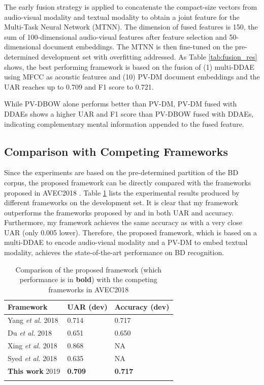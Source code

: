 The early fusion strategy is applied to concatenate the compact-size vectors from audio-visual modality and textual modality to obtain a joint feature for the Multi-Task Neural Network (MTNN). The dimension of fused features is 150, the sum of 100-dimensional audio-visual features after feature selection and 50-dimensional document embeddings. The MTNN is then fine-tuned on the pre-determined development set with overfitting addressed. As Table \ref{tab:fusion_res} shows, the best performing framework is based on the fusion of (1) multi-DDAE using MFCC as acoustic features and (10) PV-DM document embeddings and the UAR reaches up to 0.709 and F1 score to 0.721. 

While PV-DBOW alone performs better than PV-DM, PV-DM fused with DDAEs shows a higher UAR and F1 score than PV-DBOW fused with DDAEs, indicating complementary mental information appended to the fused feature.



\subsection{Comparison with Competing Frameworks}

Since the experiments are based on the pre-determined partition of the BD corpus, the proposed framework can be directly compared with the frameworks proposed in AVEC2018 \cite{ringeval2018}. Table \ref{tab:avec2018_compare} lists the experimental results produced by different frameworks on the development set. It is clear that my framework outperforms the frameworks proposed by \cite{du2018} and \cite{syed2018} in both UAR and accuracy. Furthermore, my framework achieves the same accuracy as \cite{yang2018} with a very close UAR (only 0.005 lower). Therefore, the proposed framework, which is based on a multi-DDAE to encode audio-visual modality and a PV-DM to embed textual modality, achieves the state-of-the-art performance on BD recognition.

\begin{table}[h]
    \small
    \centering
    \caption{Comparison of the proposed framework (which performance is in \textbf{bold}) with the competing frameworks in AVEC2018}
    \begin{tabular}{l|l|l}
    \Xhline{2\arrayrulewidth}
        Framework & UAR (dev) & Accuracy (dev) \\
        \hline
        Yang \textit{et al.} 2018 & 0.714 & 0.717 \\
        \hline
        Du \textit{et al.} 2018 & 0.651 & 0.650 \\
        \hline
        Xing \textit{et al.} 2018 & 0.868 & NA \\
        \hline
        Syed \textit{et al.} 2018 & 0.635 & NA \\
        \hline
        \textbf{This work} 2019 & \textbf{0.709} & \textbf{0.717} \\
    \Xhline{2\arrayrulewidth}
    \end{tabular}
    \label{tab:avec2018_compare}
\end{table}


